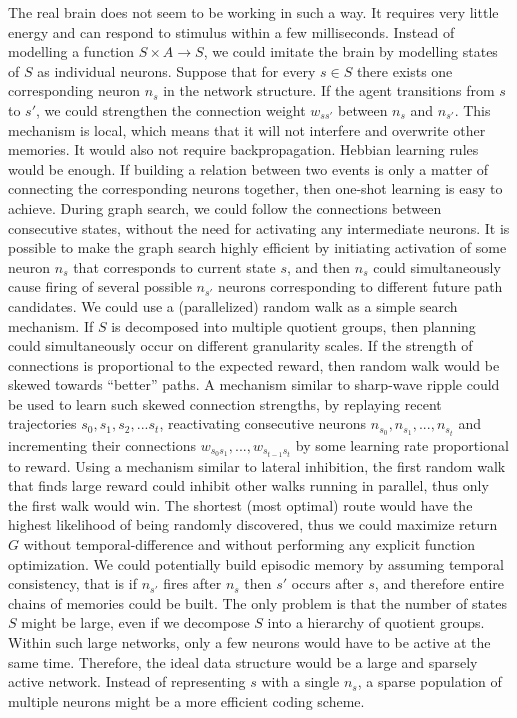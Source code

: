 \documentclass[oneside,english,logo]{amuthesis}
\begin{document}
The real brain does not seem to be working in such a way. It requires very little energy and can respond to stimulus within a few milliseconds. Instead of modelling a function $S\times A \rightarrow S$, we could imitate the brain by modelling states of $S$ as individual neurons. Suppose that for every $s\in S$ there exists one corresponding neuron $n_s$ in the network structure. If the agent transitions from $s$ to $s'$, we could strengthen the connection weight $w_{ss'}$ between $n_s$ and $n_{s'}$. This mechanism is local, which means that it will not interfere and overwrite other memories. It would also not require backpropagation. Hebbian learning rules would be enough. If building a relation between two events is only a matter of connecting the corresponding neurons together, then one-shot learning is easy to achieve. During graph search, we could follow the connections between consecutive states, without the need for activating any intermediate neurons. It is possible to make the graph search highly efficient by initiating activation of some neuron $n_{s}$ that corresponds to current state $s$, and then $n_s$ could simultaneously cause firing of several possible $n_{s'}$ neurons corresponding to different future path candidates. We could use a (parallelized) random walk  as a simple search mechanism. If $S$ is decomposed into multiple quotient groups, then planning could simultaneously occur on different granularity scales. If the strength of connections is proportional to the expected reward, then random walk would be skewed towards ``better'' paths. A mechanism similar to sharp-wave ripple could be used to learn such skewed connection strengths, by replaying recent trajectories $s_0,s_1,s_2,...s_t$, reactivating consecutive neurons $n_{s_0},n_{s_1},...,n_{s_t}$ and incrementing their connections $w_{s_0s_1},...,w_{s_{t-1}s_t}$ by some learning rate proportional to reward. Using a mechanism similar to lateral inhibition, the first random walk that finds  large reward could inhibit other walks running in parallel, thus only the first walk would win. The shortest (most optimal) route would have the highest likelihood of being randomly discovered, thus we could maximize return $G$ without temporal-difference and without performing any explicit function optimization. We could potentially build episodic memory by assuming temporal consistency, that is if $n_{s'}$ fires after $n_{s}$ then $s'$ occurs after $s$, and therefore entire chains of memories could be built. The only problem is that the number of states $S$ might be large, even if we decompose $S$ into a hierarchy of quotient groups. Within such large networks, only a few neurons would have to be active at the same time. Therefore, the ideal data structure would be a large and sparsely active network.  Instead of representing $s$ with a single $n_{s}$, a sparse population of multiple neurons might be a more efficient coding scheme.
\end{document}
